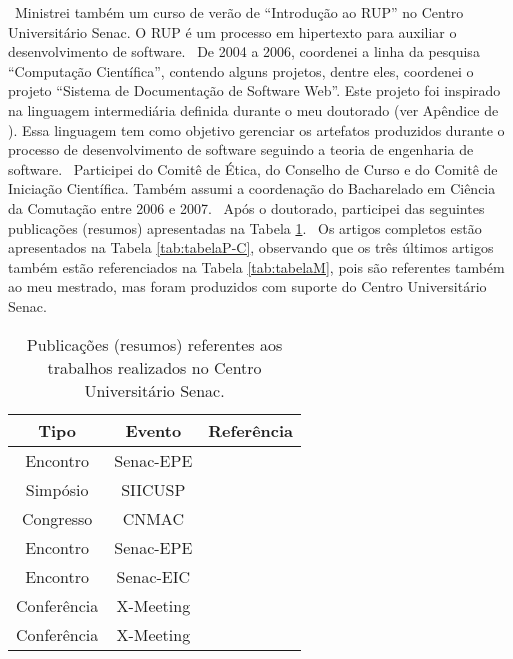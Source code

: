 \
Ministrei também um curso de verão de ``Introdução ao RUP'' no Centro Universitário Senac. O RUP é um processo em hipertexto para auxiliar o desenvolvimento de software. 
\
De 2004 a 2006, coordenei a linha da pesquisa ``Computação Científica'', contendo alguns projetos, dentre eles, coordenei o projeto ``Sistema de Documentação de Software Web''. Este projeto foi inspirado na linguagem intermediária definida durante o meu doutorado (ver Apêndice de ). Essa linguagem tem como objetivo gerenciar os artefatos produzidos durante o processo de desenvolvimento de software seguindo a teoria de engenharia de software. 
\
Participei do Comitê de Ética, do Conselho de Curso e do Comitê de Iniciação Científica. Também assumi a coordenação do Bacharelado em Ciência da Comutação entre 2006 e 2007.
\
Após o doutorado, participei das seguintes publicações (resumos) apresentadas na Tabela \ref{tab:tabelaP-R}. 
\
Os artigos completos estão apresentados na Tabela \ref{tab:tabelaP-C}, observando que os três últimos artigos também estão referenciados na Tabela \ref{tab:tabelaM}, pois são referentes também ao meu mestrado, mas foram produzidos com suporte do Centro Universitário Senac.

\begin{table}[!ht]
   \centering
   \caption{Publicações (resumos) referentes aos trabalhos realizados no Centro Universitário Senac.}\label{tab:tabelaP-R}
\begin{tabular}{|c|c|c|}
\hline
\textbf{Tipo} & \textbf{Evento} & \textbf{Referência} \\ \hline
  Encontro & Senac-EPE &  \cite{trias2005toolbox} \\ \hline
  Simpósio & SIICUSP &  \cite{2005:Trias.Zampirolli} \\ \hline
  Congresso & CNMAC &  \cite{trias2005toolbox3} \\ \hline
  Encontro & Senac-EPE &  \cite{zampirolli2005ads} \\ \hline
  Encontro & Senac-EIC &  \cite{trias2006scripts} \\ \hline
  Conferência & X-Meeting &  \cite{zampirolli2007modeling} \\ \hline
  Conferência & X-Meeting &  \cite{rizzio2007multiscale} \\ \hline
\end{tabular}
\end{table}

